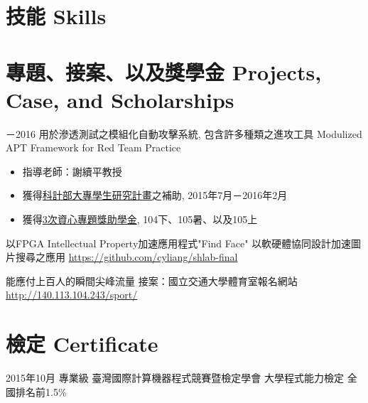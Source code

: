 \documentclass[11pt,a4paper,sans,english]{moderncv}
\begin{document}
\section{{\zh 技能} Skills}
        
\section{{\zh 專題、接案、以及獎學金} Projects, Case, and Scholarships}
    \cventry
        {－2016} %
        {\zh 用於滲透測試之模組化自動攻擊系統, 包含許多種類之進攻工具} %
        {Modulized APT Framework for Red Team Practice} %
        {}
        {} %
        {\begin{itemize}
        \item \zh 指導老師：謝續平教授
        \item \zh 獲得\underline{科計部大專學生研究計畫}之補助, 2015年7月－2016年2月
        \item \zh 獲得\underline{3次資心專題獎助學金}, 104下、105暑、以及105上
        \end{itemize}%
        }
        
    \cventry
        {}
        {{\zh 以}FPGA Intellectual Property{\zh 加速應用程式}"Find Face"}
        {\zh 以軟硬體協同設計加速圖片搜尋之應用}
        {}
        {\href{https://github.com/cyliang/shlab-final}{\textnormal{https://github.com/cyliang/shlab-final}}}
        {}

        
    \cventry
        {}
        {\zh 能應付上百人的瞬間尖峰流量}
        {\zh 接案：國立交通大學體育室報名網站}
        {}
        {\href{http://140.113.104.243/sport/}{\textnormal{http://140.113.104.243/sport/}}}
        {}
        
\section{{\zh 檢定} Certificate}
    \cventry
        {\zh 2015年10月} %
        {\zh 專業級} %
        {\zh 臺灣國際計算機器程式競賽暨檢定學會 大學程式能力檢定} %
        {}
        {\zh 全國排名前1.5\%} %
        {}
\end{document}
